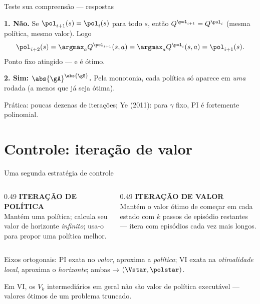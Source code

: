 \documentclass[aspectratio=169, 11pt]{beamer}
\begin{document}
\begin{frame}{Teste sua compreensão --- respostas}
  \begin{respbox}
    \textbf{1. Não.} Se $\pol_{i+1}(s) = \pol_i(s)$ para todo $s$, então
    $Q^{\pol_{i+1}} = Q^{\pol_i}$ (mesma política, mesmo valor). Logo
    \[
      \pol_{i+2}(s) = \argmax_a Q^{\pol_{i+1}}(s,a) = \argmax_a Q^{\pol_i}(s,a) = \pol_{i+1}(s).
    \]
    Ponto fixo atingido --- e é ótimo.
  \end{respbox}
  \begin{respbox}
    \textbf{2. Sim: $\abs{\gA}^{\abs{\gS}}$.} Pela monotonia, cada política só aparece em
    \emph{uma} rodada (a menos que já seja ótima).
  \end{respbox}
  \begin{ideiabox}
    Prática: poucas dezenas de iterações; Ye (2011): para $\gamma$ fixo, PI é
    \alert{fortemente polinomial}.
  \end{ideiabox}
\end{frame}

\section{Controle: iteração de valor}

\begin{frame}{Uma segunda estratégia de controle}
  \begin{columns}[T]
    \begin{column}{0.49\textwidth}
      {\color{rlAzulClaro}\small\bfseries ITERAÇÃO DE POLÍTICA}\\[0.3em]
      {\small Mantém uma \alert{política}; calcula seu valor de horizonte
      \emph{infinito}; usa-o para propor uma política melhor.}
    \end{column}
    \begin{column}{0.49\textwidth}
      {\color{rlLaranja}\small\bfseries ITERAÇÃO DE VALOR}\\[0.3em]
      {\small Mantém o \alert{valor ótimo} de começar em cada estado com $k$ passos de
      episódio restantes --- itera com episódios cada vez mais longos.}
    \end{column}
  \end{columns}
  \vspace{0.6em}
  \begin{ideiabox}
    Eixos ortogonais: PI exata no \emph{valor}, aproxima a \emph{política}; VI exata na
    \emph{otimalidade local}, aproxima o \emph{horizonte}; ambas → $(\Vstar, \polstar)$.
  \end{ideiabox}
  \begin{alertabox}
    Em VI, os $V_k$ intermediários em geral \alert{não} são valor de política
    executável --- valores ótimos de um problema truncado.
  \end{alertabox}
\end{frame}
\end{document}
